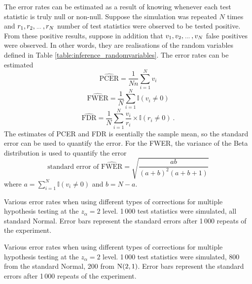 The error rates can be estimated as a result of knowing whenever each test statistic is truly null or non-null. Suppose the simulation was repeated $N$ times and $r_1,r_2,\dotdotdot,r_N$ number of test statistics were observed to be tested positive. From these positive results, suppose in addition that $v_1,v_2,\dotdotdot,v_N$ false positives were observed. In other words, they are realisations of the random variables defined in Table \ref{table:inference_randomvariables}. The error rates can be estimated
\begin{equation}
	\widehat{\text{PCER}} = \frac{1}{Nn}\sum_{i=1}^N v_i
\end{equation}
\begin{equation}
	\widehat{\text{FWER}} = \frac{1}{N} \sum_{i=1}^N \mathbb{I}(v_i\neq 0)
\end{equation}
\begin{equation}
	\widehat{\text{FDR}} = \frac{1}{N}\sum_{i=1}^N\dfrac{v_i}{r_i}\times\mathbb{I}(r_i\neq0)
	\ .
\end{equation}
The estimates of PCER and FDR is esentially the sample mean, so the standard error can be used to quantify the error. For the FWER, the variance of the Beta distribution is used to quantify the error
\begin{equation}
	\text{standard error of }\widehat{\text{FWER}} = 
	\sqrt{\dfrac{ab}{(a+b)^2(a+b+1)}}
\end{equation}
where $a = \sum_{i=1}^N \mathbb{I}(v_i\neq 0)$ and $b = N - a$.

\begin{table}
    \centering
    
    \caption{Various error rates when using different types of corrections for multiple hypothesis testing at the $z_\alpha=2$ level. 1\,000 test statistics were simulated, all standard Normal. Error bars represent the standard errors after 1\,000 repeats of the experiment.}
    \label{table:inference_error_rate1}
\end{table}

\begin{table}
    \centering
    
    \caption{Various error rates when using different types of corrections for multiple hypothesis testing at the $z_\alpha=2$ level. 1\,000 test statistics were simulated, 800 from the standard Normal, 200 from $\operatorname{N}(2,1)$. Error bars represent the standard errors after 1\,000 repeats of the experiment.}
     \label{table:inference_error_rate1}
\end{table}

